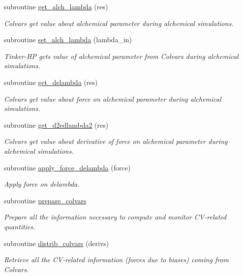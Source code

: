 \begin{DoxyCompactItemize}
subroutine \hyperlink{MOD__colvars_8f90_aaa1875980bf1dcc7c8953875008c5bcd}{get\-\_\-alch\-\_\-lambda} (res)
\begin{DoxyCompactList}\small\item\em Colvars get value about alchemical parameter during alchemical simulations. \end{DoxyCompactList}\item 
subroutine \hyperlink{MOD__colvars_8f90_a9d44226acc791e7f4822a4eae70a722d}{set\-\_\-alch\-\_\-lambda} (lambda\-\_\-in)
\begin{DoxyCompactList}\small\item\em Tinker-\/\-H\-P gets value of alchemical parameter from Colvars during alchemical simulations. \end{DoxyCompactList}\item 
subroutine \hyperlink{MOD__colvars_8f90_aed95a8cbdc22006152c0536ad76a3d54}{get\-\_\-delambda} (res)
\begin{DoxyCompactList}\small\item\em Colvars get value about force on alchemical parameter during alchemical simulations. \end{DoxyCompactList}\item 
subroutine \hyperlink{MOD__colvars_8f90_aa74e00e707842c40f9c520a941d50ae6}{get\-\_\-d2edlambda2} (res)
\begin{DoxyCompactList}\small\item\em Colvars get value about derivative of force on alchemical parameter during alchemical simulations. \end{DoxyCompactList}\item 
subroutine \hyperlink{MOD__colvars_8f90_ab44b2e15a5a4b2d6fdebf9b9465aa0ff}{apply\-\_\-force\-\_\-delambda} (force)
\begin{DoxyCompactList}\small\item\em Apply force on delambda. \end{DoxyCompactList}\item 
subroutine \hyperlink{MOD__colvars_8f90_a87b3953d6201c56b5f582e437023d9fd}{prepare\-\_\-colvars}
\begin{DoxyCompactList}\small\item\em Prepare all the information necessary to compute and monitor C\-V-\/related quantities. \end{DoxyCompactList}\item 
subroutine \hyperlink{MOD__colvars_8f90_af0e5b1e6b1dac7dea513744d77045234}{distrib\-\_\-colvars} (derivs)
\begin{DoxyCompactList}\small\item\em Retrieve all the C\-V-\/related information (forces due to biases) coming from Colvars. \end{DoxyCompactList}\item 

\end{DoxyCompactItemize}
